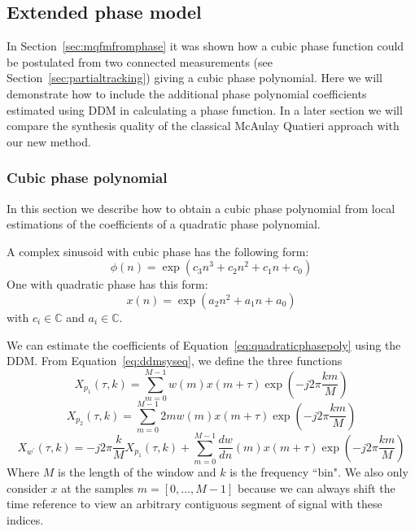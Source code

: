 \documentclass[letterpaper,12pt]{report}
\begin{document}
\subsection{Extended phase model}

In Section~\ref{sec:mqfmfromphase} it was shown how a cubic phase function could
be postulated from two connected measurements (see
Section~\ref{sec:partialtracking}) giving a cubic phase polynomial. Here we will
demonstrate how to include the additional phase polynomial coefficients
estimated using DDM in calculating a phase function. In a later section we will
compare the synthesis quality of the classical McAulay \textendash Quatieri
approach with our new method.

\subsubsection{Cubic phase polynomial\label{sec:cubicphasepoly} }

In this section we describe how to obtain a cubic phase polynomial from
local estimations of the coefficients of a quadratic phase polynomial.

A complex sinusoid with cubic phase has the following form:
\begin{equation}
    \label{eq:cubicphasepoly}
    \phi(n) = \exp \left(c_3 n^{3} + c_2 n^{2} + c_1 n + c_0 \right)
\end{equation}
One with quadratic phase has this form:
\begin{equation}
    \label{eq:quadraticphasepoly}
    x(n) = \exp \left(a_2 n^{2} + a_1 n + a_0 \right)
\end{equation}
with $c_{i} \in \mathbb{C}$ and $a_{i} \in \mathbb{C}$.

We can estimate the coefficients of Equation~\ref{eq:quadraticphasepoly} using the DDM. From
Equation~\ref{eq:ddmsyseq}, we define the three functions
\begin{equation}
    X_{p_{1}} \left( \tau, k \right)
    =
    \sum_{m=0}^{M-1} w(m) x(m + \tau) \exp(-j 2 \pi \frac{k m}{M})
\end{equation}
\begin{equation}
    X_{p_{2}} \left( \tau, k \right)
    =
    \sum_{m=0}^{M-1} 2 m w(m) x(m + \tau) \exp(-j 2 \pi \frac{k m}{M})
\end{equation}
\begin{equation}
    X_{w^{\prime}} \left( \tau, k \right)
    =
    -j 2 \pi \frac{k}{M} X_{p_{1}} \left( \tau , k \right) + 
    \sum_{m=0}^{M-1} \frac{dw}{dn}(m) x(m + \tau) \exp(-j 2 \pi \frac{k m}{M})
\end{equation}
Where $M$ is the length of the window and $k$ is the frequency ``bin". We also
only consider $x$ at the samples $m = [0, \dotsc, M-1]$ because we can always
shift the time reference to view an arbitrary contiguous segment of signal with
these indices.
\end{document}
